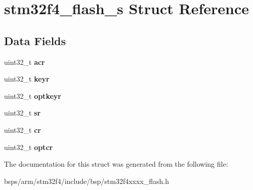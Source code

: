 \hypertarget{structstm32f4__flash__s}{}\section{stm32f4\+\_\+flash\+\_\+s Struct Reference}
\label{structstm32f4__flash__s}
\subsection*{Data Fields}
\begin{DoxyCompactItemize}
\item 
\mbox{\label{structstm32f4__flash__s_ad0ebd7540d23141e8b2a95d21a8823e9}} 
uint32\+\_\+t {\bfseries acr}
\item 
\mbox{\label{structstm32f4__flash__s_ad8cd410c68c27496de4ef8bf3e708d13}} 
uint32\+\_\+t {\bfseries keyr}
\item 
\mbox{\label{structstm32f4__flash__s_a29194c7b2ebb1f15e9a2e0b6ed1bc3b0}} 
uint32\+\_\+t {\bfseries optkeyr}
\item 
\mbox{\label{structstm32f4__flash__s_a98fd943578c5202f27eddfc5ac757565}} 
uint32\+\_\+t {\bfseries sr}
\item 
\mbox{\label{structstm32f4__flash__s_af8ce3576391dc474eaccbe7818418c5a}} 
uint32\+\_\+t {\bfseries cr}
\item 
\mbox{\label{structstm32f4__flash__s_a78f48810c05fa0ef3cecb7faab125c0e}} 
uint32\+\_\+t {\bfseries optcr}
\end{DoxyCompactItemize}


The documentation for this struct was generated from the following file\+:\begin{DoxyCompactItemize}
\item 
bsps/arm/stm32f4/include/bsp/stm32f4xxxx\+\_\+flash.\+h\end{DoxyCompactItemize}

